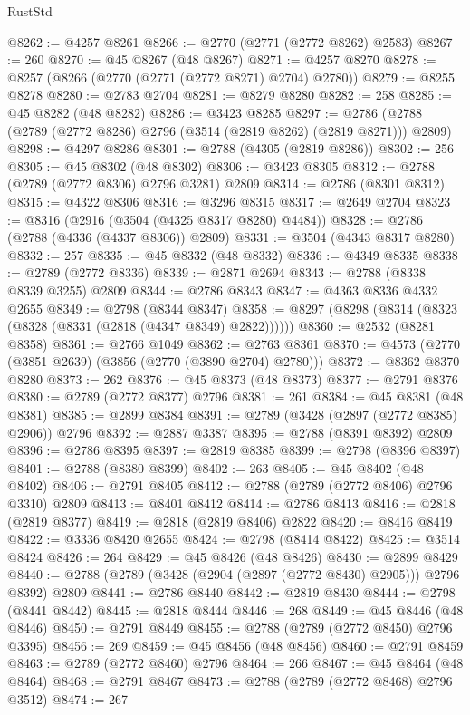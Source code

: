 \begin{lexlean}{RustStd}
\begin{coremodule}
@8262 := @4257 @8261
@8266 := @2770 (@2771 (@2772 @8262) @2583)
@8267 := 260
@8270 := @45 @8267 (@48 @8267)
@8271 := @4257 @8270
@8278 := @8257 (@8266 (@2770 (@2771 (@2772 @8271) @2704) @2780))
@8279 := @8255 @8278
@8280 := @2783 @2704
@8281 := @8279 @8280
@8282 := 258
@8285 := @45 @8282 (@48 @8282)
@8286 := @3423 @8285
@8297 := @2786 (@2788 (@2789 (@2772 @8286) @2796 (@3514 (@2819 @8262) (@2819 @8271))) @2809)
@8298 := @4297 @8286
@8301 := @2788 (@4305 (@2819 @8286))
@8302 := 256
@8305 := @45 @8302 (@48 @8302)
@8306 := @3423 @8305
@8312 := @2788 (@2789 (@2772 @8306) @2796 @3281) @2809
@8314 := @2786 (@8301 @8312)
@8315 := @4322 @8306
@8316 := @3296 @8315
@8317 := @2649 @2704
@8323 := @8316 (@2916 (@3504 (@4325 @8317 @8280) @4484))
@8328 := @2786 (@2788 (@4336 (@4337 @8306)) @2809)
@8331 := @3504 (@4343 @8317 @8280)
@8332 := 257
@8335 := @45 @8332 (@48 @8332)
@8336 := @4349 @8335
@8338 := @2789 (@2772 @8336)
@8339 := @2871 @2694
@8343 := @2788 (@8338 @8339 @3255) @2809
@8344 := @2786 @8343
@8347 := @4363 @8336 @4332 @2655
@8349 := @2798 (@8344 @8347)
@8358 := @8297 (@8298 (@8314 (@8323 (@8328 (@8331 (@2818 (@4347 @8349) @2822))))))
@8360 := @2532 (@8281 @8358)
@8361 := @2766 @1049
@8362 := @2763 @8361
@8370 := @4573 (@2770 (@3851 @2639) (@3856 (@2770 (@3890 @2704) @2780)))
@8372 := @8362 @8370 @8280
@8373 := 262
@8376 := @45 @8373 (@48 @8373)
@8377 := @2791 @8376
@8380 := @2789 (@2772 @8377) @2796
@8381 := 261
@8384 := @45 @8381 (@48 @8381)
@8385 := @2899 @8384
@8391 := @2789 (@3428 (@2897 (@2772 @8385) @2906)) @2796
@8392 := @2887 @3387
@8395 := @2788 (@8391 @8392) @2809
@8396 := @2786 @8395
@8397 := @2819 @8385
@8399 := @2798 (@8396 @8397)
@8401 := @2788 (@8380 @8399)
@8402 := 263
@8405 := @45 @8402 (@48 @8402)
@8406 := @2791 @8405
@8412 := @2788 (@2789 (@2772 @8406) @2796 @3310) @2809
@8413 := @8401 @8412
@8414 := @2786 @8413
@8416 := @2818 (@2819 @8377)
@8419 := @2818 (@2819 @8406) @2822
@8420 := @8416 @8419
@8422 := @3336 @8420 @2655
@8424 := @2798 (@8414 @8422)
@8425 := @3514 @8424
@8426 := 264
@8429 := @45 @8426 (@48 @8426)
@8430 := @2899 @8429
@8440 := @2788 (@2789 (@3428 (@2904 (@2897 (@2772 @8430) @2905))) @2796 @8392) @2809
@8441 := @2786 @8440
@8442 := @2819 @8430
@8444 := @2798 (@8441 @8442)
@8445 := @2818 @8444
@8446 := 268
@8449 := @45 @8446 (@48 @8446)
@8450 := @2791 @8449
@8455 := @2788 (@2789 (@2772 @8450) @2796 @3395)
@8456 := 269
@8459 := @45 @8456 (@48 @8456)
@8460 := @2791 @8459
@8463 := @2789 (@2772 @8460) @2796
@8464 := 266
@8467 := @45 @8464 (@48 @8464)
@8468 := @2791 @8467
@8473 := @2788 (@2789 (@2772 @8468) @2796 @3512)
@8474 := 267

\end{coremodule}
\end{lexlean}
